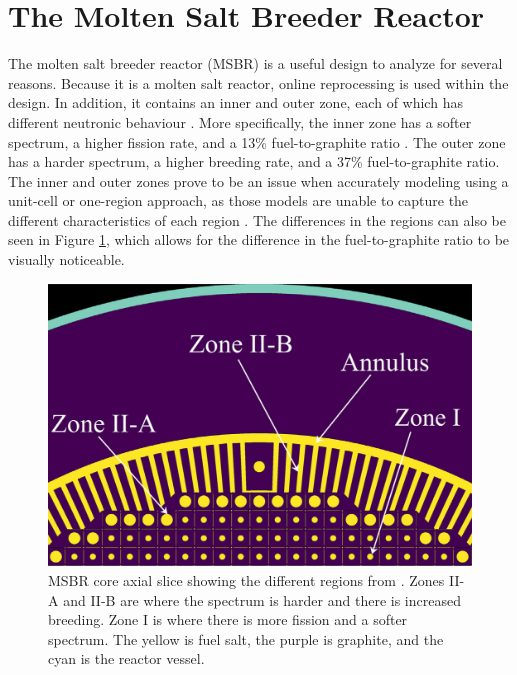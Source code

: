 

\section{The Molten Salt Breeder Reactor}

The molten salt breeder reactor (MSBR) is a useful design to analyze for several reasons. Because it is a molten salt reactor, online reprocessing is used within the design. In addition, it contains an inner and outer zone, each of which has different neutronic behaviour \cite{robertson_conceptual_1971}. More specifically, the inner zone has a softer spectrum, a higher fission rate, and a 13\% fuel-to-graphite ratio \cite{park_whole_2015}. The outer zone has a harder spectrum, a higher breeding rate, and a 37\% fuel-to-graphite ratio. The inner and outer zones prove to be an issue when accurately modeling using a unit-cell or one-region approach, as those models are unable to capture the different characteristics of each region \cite{rykhlevskii_modeling_2019}. The differences in the regions can also be seen in Figure \ref{fig:msbr_ryklev}, which allows for the difference in the fuel-to-graphite ratio to be visually noticeable.

\begin{figure}[H]
  \centering
  \includegraphics[scale=0.25]{images/msbr_ryk_1.PNG}
  \caption{MSBR core axial slice showing the different regions from \cite{rykhlevskii_modeling_2019}. Zones II-A and II-B are where the spectrum is harder and there is increased breeding. Zone I is where there is more fission and a softer spectrum. The yellow is fuel salt, the purple is graphite, and the cyan is the reactor vessel.}
   \label{fig:msbr_ryklev}
\end{figure}

